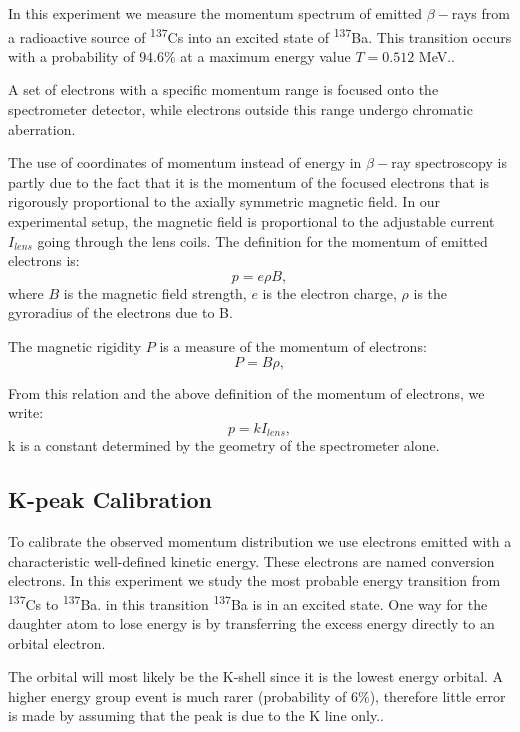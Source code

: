 \documentclass[10pt, a4paper]{article}
\begin{document}
\begin{multicols}{2}
In this experiment we measure the momentum spectrum of emitted $\beta-$rays from a radioactive source of \textsuperscript{137}Cs into an excited state of \textsuperscript{137}Ba. This transition occurs with a probability of $94.6\%$ at a maximum energy value $T = 0.512$ MeV.\cite{SPA}.

A set of electrons with a specific momentum range is focused onto the spectrometer detector, while electrons outside this range undergo chromatic aberration. 

The use of coordinates of momentum instead of energy in $\beta-$ray spectroscopy is partly due to the fact that it is the momentum of the focused electrons that is rigorously proportional to the axially symmetric magnetic field.\cite{QH, Siegbahn} 
In our experimental setup, the magnetic field is proportional to the adjustable current $I_{lens}$ going through the lens coils.
The definition for the momentum of emitted electrons is:
\begin{equation}p = e \rho B,
\end{equation} 
where $B$ is the magnetic field strength, $e$ is the electron charge, $\rho$ is the gyroradius of the electrons due to B.

The magnetic rigidity $P$ is a measure of the momentum of electrons\cite{Wikipedia-Rigidity}:
\begin{equation}P = B \rho,
\end{equation}

From this relation and the above definition of the momentum of electrons, we write:
\begin{equation}p = kI_{lens},
\end{equation}
k is a constant determined by the geometry of the spectrometer alone\cite{QH}.
\subsection{K-peak Calibration}
To calibrate the observed momentum distribution we use electrons emitted with a characteristic well-defined kinetic energy\cite{SPA}.
These electrons are named conversion electrons.
In this experiment we study the most probable energy transition from \textsuperscript{137}Cs to \textsuperscript{137}Ba. in this transition \textsuperscript{137}Ba is in an excited state. 
One way for the daughter atom to lose energy is by transferring the excess energy directly to an orbital electron\cite{SPA}.

The orbital will most likely be the K-shell since it is the lowest energy orbital. A higher energy group event is much rarer (probability of $6\%$), therefore little error is made  by assuming that the peak is due to the K line only.\cite{SPA}.


\end{multicols}
\end{document}
